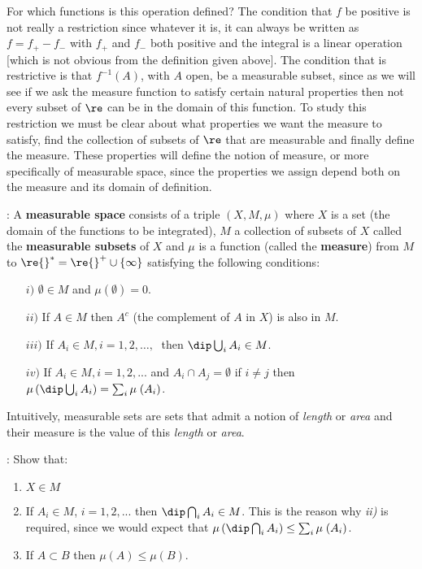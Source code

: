 For which functions is this operation defined? The condition that $f$ be positive is not really a restriction since whatever it is, it can always be written as $f = f_+ - f_-$ with $f_+$ and $f_-$ both positive and the integral is a linear operation [which is not obvious from the definition given above]. The condition that is restrictive is that $f^{-1} (A)$, with $A$ open, be a measurable subset, since as we will see if we ask the measure function to satisfy certain natural properties then not every subset of $\re$ can be in the domain of this function. To study this restriction we must be clear about what properties we want the measure to satisfy, find the collection of subsets of $\re$ that are measurable and finally define the measure. These properties will define the notion of measure, or more specifically of measurable space, since the properties we assign depend both on the measure and its domain of definition.
\espa

: A {\bf measurable space} consists of a triple $(X,M,\mu)$ where $X$ is a set (the domain of the functions to be integrated), $M$ a collection of subsets of $X$ called the {\bf measurable subsets} of $X$ and $\mu$ is a function (called the {\bf measure}) from $M$ to $\re{}^*=\re{}^+ \cup \{\infty\}$ satisfying the following conditions:
\begin{itemize}
\item[$i)$] $\emptyset \in M$ and $\mu(\emptyset ) = 0$.
\item[$ii)$] If $A \in M$ then $A^c$ (the complement of $A$ in $X$) is also in $M$.
\item[$iii)$] If $A_i \in M, i=1,2,\ldots,\;$ then $\dip\bigcup_i A_i \in M$.
\item[$iv)$] If $A_i \in M, i=1,2,...$ and $A_i \cap A_j = \emptyset$ if $i \neq j$ then $\mu \left( \dip\bigcup_i A_i \right)=\sum _i \mu\;(A_i)$.
\end{itemize}

Intuitively, measurable sets are sets that admit a notion of {\sl length} or {\sl area} and their measure is the value of this {\sl length} or {\sl area}.

\ejer: Show that:

\begin{enumerate}
\item $X \in M$
\item If $A_i \in M$, $i=1,2,...$ then $\dip\bigcap_i A_i \in M$. This is the reason why {\it ii)} is required, since we would expect that $\mu \left( \dip\bigcap_i A_i \right) \leq \sum _i \mu\;(A_i)$.
\item If $A \subset B$ then $\mu (A) \leq \mu (B).$
\end{enumerate}


